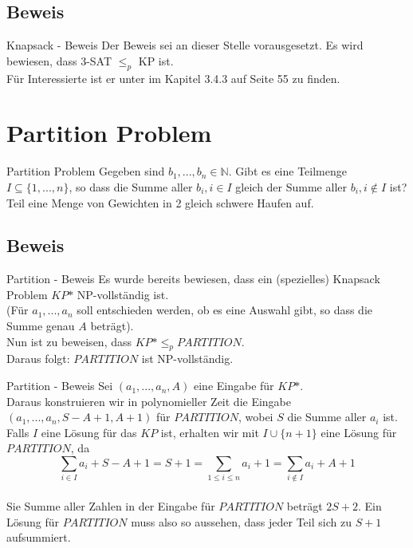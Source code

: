 \documentclass[12pt,handout,notes=dontshow,xcolor=table]{beamer}
\begin{document}
\subsection{Beweis}
\begin{frame}{Knapsack - Beweis}
Der Beweis sei an dieser Stelle vorausgesetzt.
Es wird bewiesen, dass 3-SAT \(\le_p\) KP ist.\\
Für Interessierte ist er unter \cite{wegener} im Kapitel 3.4.3 auf Seite 55 zu finden.
\end{frame}



\section{Partition Problem}
\begin{frame}{Partition Problem}
Gegeben sind \(b_1,...,b_n \in \mathbb{N}\). Gibt es eine Teilmenge \(I \subseteq \{1,...,n\}\), so dass die Summe aller \(b_i, i \in I\) gleich der Summe aller \(b_i, i \notin I\) ist?\\
\textrightarrow Teil eine Menge von Gewichten in 2 gleich schwere Haufen auf.
\end{frame}

\subsection{Beweis}
\begin{frame}{Partition - Beweis}
Es wurde bereits bewiesen, dass ein (spezielles) Knapsack Problem \(KP\mbox{*}\) NP-vollständig ist.\\
(Für \(a_1,...,a_n\) soll entschieden werden, ob es eine Auswahl gibt, so dass die Summe genau \(A\) beträgt).\\
Nun ist zu beweisen, dass \(KP\mbox{*} \leq_p PARTITION\).\\
Daraus folgt: \(PARTITION\) ist NP-vollständig.
\end{frame}

\begin{frame}{Partition - Beweis}
Sei \((a_1,...,a_n,A)\) eine Eingabe für \(KP\mbox{*}\).\\
Daraus konstruieren wir in polynomieller Zeit die Eingabe\\
\((a_1,...,a_n,S-A+1,A+1)\) für \(PARTITION\), wobei \(S\) die Summe aller \(a_i\) ist.\\
Falls \(I\) eine Lösung für das \(KP\) ist, erhalten wir mit \(I \cup \{n+1\}\) eine Lösung für \(PARTITION\), da\\
$$\sum_{i \in I}a_i + S - A + 1 = S + 1 = \sum_{1 \le i \le n}a_i + 1 = \sum_{i \notin I}a_i + A + 1$$\\
Sie Summe aller Zahlen in der Eingabe für \(PARTITION\) beträgt \(2S + 2\).
Ein Lösung für \(PARTITION\) muss also so aussehen, dass jeder Teil sich zu \(S + 1\) aufsummiert.
\end{frame}
\end{document}

